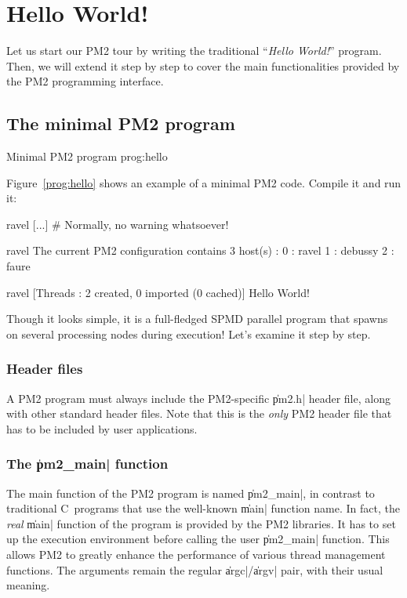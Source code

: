 \section{Hello World!}

Let us start our PM2 tour by writing the traditional ``\emph{Hello
  World!}'' program. Then, we will extend it step by step to cover the
main functionalities provided by the PM2 programming interface.

\subsection{The minimal PM2 program}

 {Minimal PM2 program} {prog:hello}

Figure~\ref{prog:hello} shows an
example of a minimal PM2 code. Compile it and run it:
\begin{shell}
ravel%
[...]   # Normally, no warning whatsoever!

ravel%
The current PM2 configuration contains 3 host(s) :
0 : ravel
1 : debussy
2 : faure

ravel%
[Threads : 2 created, 0 imported (0 cached)]
Hello World!
\end{shell}
Though it looks simple, it is a full-fledged SPMD parallel program
that spawns on several processing nodes during execution! Let's
examine it step by step.

\subsubsection{Header files}

A PM2 program must always include the PM2-specific \|pm2.h| header
file, along with other standard header files.  Note that this is the
\emph{only} PM2 header file that has to be included by user
applications.

\subsubsection{The \|pm2_main| function}

The main function of the PM2 program is named \|pm2_main|, in contrast
to traditional C~programs that use the well-known \|main|
function name. In fact, the \emph{real} \|main| function of the
program is provided by the PM2 libraries. It has to set up the
execution environment before calling the user \|pm2_main| function.
This allows PM2 to greatly enhance the performance of various thread
management functions.  The arguments remain the regular
\|argc|/\|argv| pair, with their usual meaning.

